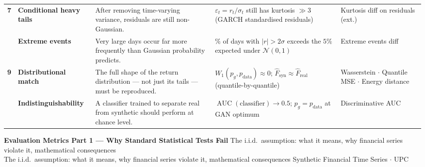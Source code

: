 \documentclass[10pt]{article}
\newcommand{\pagehead}[2]{%
  \begin{tcolorbox}[enhanced,arc=0pt,outer arc=0pt,boxrule=0pt,
    colback=Navy,colframe=Navy,
    top=5pt,bottom=5pt,left=8pt,right=8pt,
    before skip=0pt,after skip=10pt]
  {\color{white}\large\bfseries #1}%
  \ifx\relax#2\relax\else\\[1pt]{\color{blue!30!white}\small #2}\fi
  \hfill{\color{blue!20!white}\footnotesize Synthetic Financial Time Series $\cdot$ UPC}
  \end{tcolorbox}}
\begin{document}
\begin{longtable}{%
  >{\bfseries\centering}p{}
  >{\bfseries}p{}
  p{}
  p{}
  p{}}
\rowcolor{TabOdd}
7 & Conditional heavy tails &
  After removing time-varying variance, residuals are still non-Gaussian. &
  $\varepsilon_t = r_t/\sigma_t$ still has kurtosis $\gg 3$ (GARCH standardised residuals) &
  Kurtosis diff on residuals (ext.) \\

8 & Extreme events &
  Very large days occur far more frequently than Gaussian probability predicts. &
  \% of days with $|r| > 2\sigma$ exceeds the $5\%$ expected under $\mathcal{N}(0,1)$ &
  Extreme events diff \\

\rowcolor{TabOdd}
9 & Distributional match &
  The full shape of the return distribution --- not just its tails --- must be reproduced. &
  $W_1(p_g, p_\text{data}) \approx 0$;\; $\hat{F}_\text{syn} \approx \hat{F}_\text{real}$ (quantile-by-quantile) &
  Wasserstein $\cdot$ Quantile MSE $\cdot$ Energy distance \\

10 & Indistinguishability &
  A classifier trained to separate real from synthetic should perform at chance level. &
  $\operatorname{AUC}(\text{classifier}) \to 0.5$;\; $p_g = p_\text{data}$ at GAN optimum &
  Discriminative AUC \\

\bottomrule
\end{longtable}

\clearpage

\pagehead{Evaluation Metrics Part 1 --- Why Standard Statistical Tests Fail}
         {The i.i.d.\ assumption: what it means, why financial series violate it, mathematical consequences}
\end{document}
